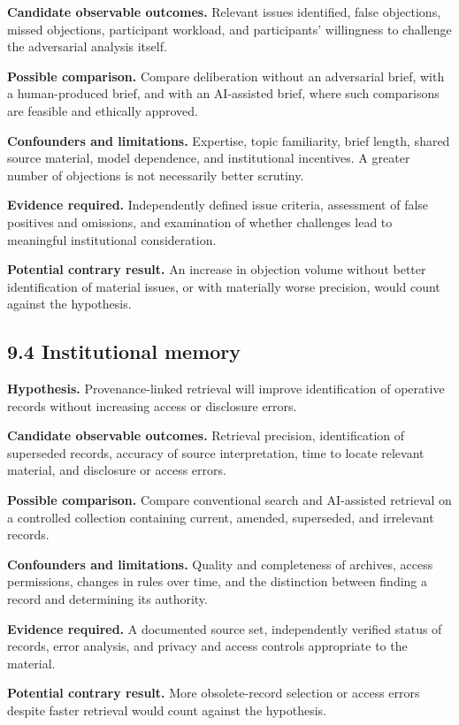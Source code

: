 \documentclass[
  10pt,
]{article}
\begin{document}
\textbf{Candidate observable outcomes.} Relevant issues identified,
false objections, missed objections, participant workload, and
participants' willingness to challenge the adversarial analysis itself.

\textbf{Possible comparison.} Compare deliberation without an
adversarial brief, with a human-produced brief, and with an AI-assisted
brief, where such comparisons are feasible and ethically approved.

\textbf{Confounders and limitations.} Expertise, topic familiarity,
brief length, shared source material, model dependence, and
institutional incentives. A greater number of objections is not
necessarily better scrutiny.

\textbf{Evidence required.} Independently defined issue criteria,
assessment of false positives and omissions, and examination of whether
challenges lead to meaningful institutional consideration.

\textbf{Potential contrary result.} An increase in objection volume
without better identification of material issues, or with materially
worse precision, would count against the hypothesis.

\subsection{9.4 Institutional memory}\label{institutional-memory}

\textbf{Hypothesis.} Provenance-linked retrieval will improve
identification of operative records without increasing access or
disclosure errors.

\textbf{Candidate observable outcomes.} Retrieval precision,
identification of superseded records, accuracy of source interpretation,
time to locate relevant material, and disclosure or access errors.

\textbf{Possible comparison.} Compare conventional search and
AI-assisted retrieval on a controlled collection containing current,
amended, superseded, and irrelevant records.

\textbf{Confounders and limitations.} Quality and completeness of
archives, access permissions, changes in rules over time, and the
distinction between finding a record and determining its authority.

\textbf{Evidence required.} A documented source set, independently
verified status of records, error analysis, and privacy and access
controls appropriate to the material.

\textbf{Potential contrary result.} More obsolete-record selection or
access errors despite faster retrieval would count against the
hypothesis.
\end{document}
